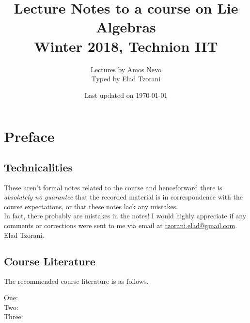 \documentclass[10pt,a4paper,twoside,openany,hidelinks]{book}
\title{Lecture Notes to a course on Lie Algebras \\ \large{Winter 2018, Technion IIT}}
\author{Lectures by Amos Nevo \\ \large Typed by Elad Tzorani}
\date{Last updated on \today}
\begin{document}
\frontmatter
{}
\tableofcontents
\countlectures
\newpage

\chapter*{Preface}
 

\section*{Technicalities}

These aren't formal notes related to the course and henceforward there is \emph{absolutely no guarantee} that the recorded material is in correspondence with the course expectations, or that these notes lack any mistakes.\\
In fact, there probably are mistakes in the notes! I would highly appreciate if any comments or corrections were sent to me via email at \href{mailto:tzorani.elad@gmail.com}{tzorani.elad@gmail.com}.\\
Elad Tzorani.

\section*{Course Literature}

The recommended course literature is as follows.
\begin{description}
\item[One:]

\item[Two:]

\item[Three:]
\end{description}

\mainmatter


\backmatter
\end{document}
